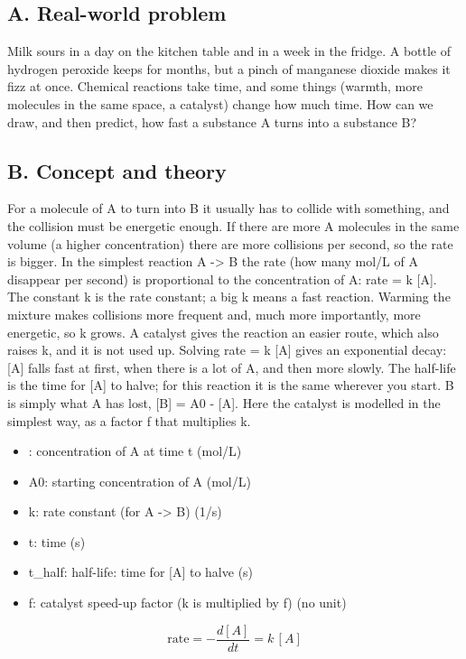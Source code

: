\documentclass[11pt,a4paper]{article}
\begin{document}
\subsection*{A. Real-world problem}
Milk sours in a day on the kitchen table and in a week in the fridge. A bottle of hydrogen peroxide keeps for months, but a pinch of manganese dioxide makes it fizz at once. Chemical reactions take time, and some things (warmth, more molecules in the same space, a catalyst) change how much time. How can we draw, and then predict, how fast a substance A turns into a substance B?

\subsection*{B. Concept and theory}
For a molecule of A to turn into B it usually has to collide with something, and the collision must be energetic enough. If there are more A molecules in the same volume (a higher concentration) there are more collisions per second, so the rate is bigger. In the simplest reaction A -\textgreater{} B the rate (how many mol/L of A disappear per second) is proportional to the concentration of A: rate = k [A]. The constant k is the rate constant; a big k means a fast reaction. Warming the mixture makes collisions more frequent and, much more importantly, more energetic, so k grows. A catalyst gives the reaction an easier route, which also raises k, and it is not used up. Solving rate = k [A] gives an exponential decay: [A] falls fast at first, when there is a lot of A, and then more slowly. The half-life is the time for [A] to halve; for this reaction it is the same wherever you start. B is simply what A has lost, [B] = A0 - [A]. Here the catalyst is modelled in the simplest way, as a factor f that multiplies k.

\begin{itemize}[nosep]
\item [A]: concentration of A at time t (mol/L)
\item A0: starting concentration of A (mol/L)
\item k: rate constant (for A -\textgreater{} B) (1/s)
\item t: time (s)
\item t\_half: half-life: time for [A] to halve (s)
\item f: catalyst speed-up factor (k is multiplied by f) (no unit)
\end{itemize}

\begin{equation*}
\text{rate}=-\frac{d[A]}{dt}=k\,[A]
\end{equation*}
\end{document}
